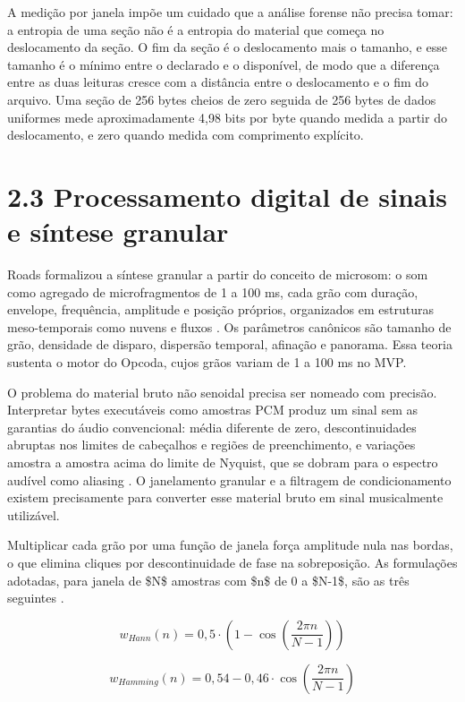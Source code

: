 \documentclass[12pt,a4paper]{article}
\begin{document}
A medição por janela impõe um cuidado que a análise forense não precisa tomar: a entropia de uma seção não é a entropia do material que começa no deslocamento da seção. O fim da seção é o deslocamento mais o tamanho, e esse tamanho é o mínimo entre o declarado e o disponível, de modo que a diferença entre as duas leituras cresce com a distância entre o deslocamento e o fim do arquivo. Uma seção de 256 bytes cheios de zero seguida de 256 bytes de dados uniformes mede aproximadamente 4,98 bits por byte quando medida a partir do deslocamento, e zero quando medida com comprimento explícito.


\section*{2.3 Processamento digital de sinais e síntese granular}

Roads formalizou a síntese granular a partir do conceito de microsom: o som como agregado de microfragmentos de 1 a 100 ms, cada grão com duração, envelope, frequência, amplitude e posição próprios, organizados em estruturas meso-temporais como nuvens e fluxos \cite{roads2001}. Os parâmetros canônicos são tamanho de grão, densidade de disparo, dispersão temporal, afinação e panorama. Essa teoria sustenta o motor do Opcoda, cujos grãos variam de 1 a 100 ms no MVP.


O problema do material bruto não senoidal precisa ser nomeado com precisão. Interpretar bytes executáveis como amostras PCM produz um sinal sem as garantias do áudio convencional: média diferente de zero, descontinuidades abruptas nos limites de cabeçalhos e regiões de preenchimento, e variações amostra a amostra acima do limite de Nyquist, que se dobram para o espectro audível como aliasing \cite{smith2007, zolzer2011}. O janelamento granular e a filtragem de condicionamento existem precisamente para converter esse material bruto em sinal musicalmente utilizável.


Multiplicar cada grão por uma função de janela força amplitude nula nas bordas, o que elimina cliques por descontinuidade de fase na sobreposição. As formulações adotadas, para janela de \$N\$ amostras com \$n\$ de 0 a \$N-1\$, são as três seguintes \cite{smith2007}.


\begin{equation}
w_{Hann}(n) = 0{,}5 \cdot \left(1 - \cos\left(\frac{2 \pi n}{N - 1}\right)\right)
\label{eq:hann}
\end{equation}

\begin{equation}
w_{Hamming}(n) = 0{,}54 - 0{,}46 \cdot \cos\left(\frac{2 \pi n}{N - 1}\right)
\label{eq:hamming}
\end{equation}
\end{document}
